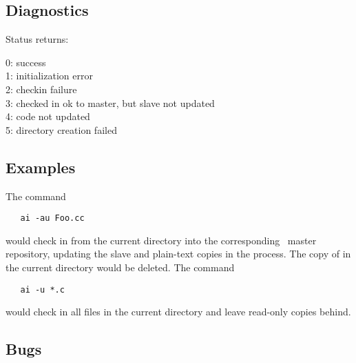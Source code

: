 \subsection*{Diagnostics}

Status returns:
\begin{status}
   0: success\\
   1: initialization error\\
   2: checkin failure\\
   3: checked in ok to master, but slave not updated\\
   4: code not updated\\
   5: directory creation failed
\end{status}

\subsection*{Examples}

The command

\begin{verbatim}
   ai -au Foo.cc
\end{verbatim}

\noindent
would check in  from the current directory into the corresponding
\aipspp\ master repository, updating the slave and plain-text copies in the
process.  The copy of  in the current directory would be deleted.
The command

\begin{verbatim}
   ai -u *.c
\end{verbatim}

\noindent
would check in all  files in the current directory and leave
read-only copies behind.

\subsection*{Bugs}

